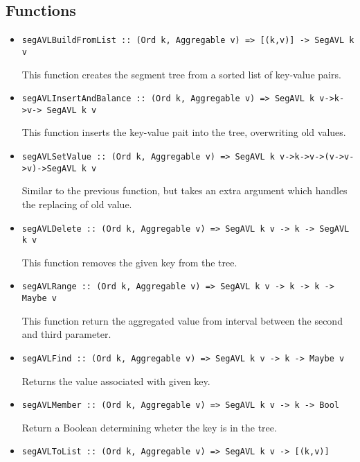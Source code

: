 \documentclass[a4paper,10pt,openany]{article}
\begin{document}
\subsection*{Functions}
\begin{itemize}
\item \begin{lstlisting}
segAVLBuildFromList :: (Ord k, Aggregable v) => [(k,v)] -> SegAVL k v
\end{lstlisting}
This function creates the segment tree from a sorted list of key-value pairs.
\item \begin{lstlisting}
segAVLInsertAndBalance :: (Ord k, Aggregable v) => SegAVL k v->k->v-> SegAVL k v
\end{lstlisting}
This function inserts the key-value pait into the tree, overwriting old values.
\item \begin{lstlisting}
segAVLSetValue :: (Ord k, Aggregable v) => SegAVL k v->k->v->(v->v->v)->SegAVL k v
\end{lstlisting}
Similar to the previous function, but takes an extra argument which handles the replacing of old value.
\item \begin{lstlisting}
segAVLDelete :: (Ord k, Aggregable v) => SegAVL k v -> k -> SegAVL k v
\end{lstlisting}
This function removes the given key from the tree.
\item \begin{lstlisting}
segAVLRange :: (Ord k, Aggregable v) => SegAVL k v -> k -> k -> Maybe v
\end{lstlisting}
This function return the aggregated value from interval between the second and third parameter.
\item \begin{lstlisting}
segAVLFind :: (Ord k, Aggregable v) => SegAVL k v -> k -> Maybe v
\end{lstlisting}
Returns the value associated with given key.
\item \begin{lstlisting}
segAVLMember :: (Ord k, Aggregable v) => SegAVL k v -> k -> Bool
\end{lstlisting}
Return a Boolean determining wheter the key is in the tree.
\item \begin{lstlisting}
segAVLToList :: (Ord k, Aggregable v) => SegAVL k v -> [(k,v)]
\end{lstlisting}

\end{itemize}
\end{document}
